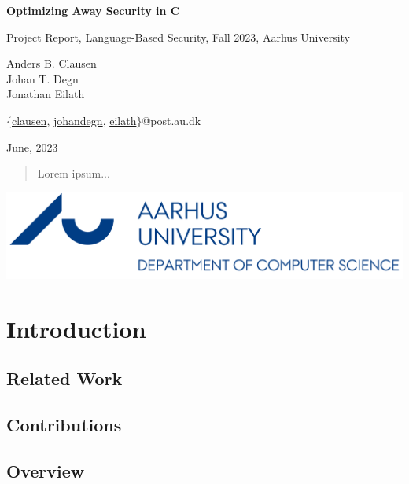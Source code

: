 \documentclass{article}
\begin{document}
\begin{titlepage}
  \vspace*{\fill}
  \begin{center}
    \huge
    \textbf{Optimizing Away Security in C}
        
    \vspace{0.2cm}
    \small
    Project Report, Language-Based Security, Fall 2023, Aarhus University
        
    \vspace{0.4cm}
    \large
    Anders B. Clausen\\ Johan T. Degn\\ Jonathan Eilath

    \vspace{0.2cm}
    \small
    $\{$\href{mailto:clausen@post.au.com}{clausen}, \href{mailto:johandegn@post.au.com}{johandegn}, \href{mailto:eilath@post.au.com}{eilath}$\}$@post.au.dk

    \vspace{0.4cm}
    June, 2023
  \end{center}

  \begin{abstract}
    Lorem ipsum...
  \end{abstract}

  \vspace*{\fill}

  \begin{center}
    \includegraphics*[width=0.2\linewidth]{assets/au_logo.png}
  \end{center}
\end{titlepage}



\pagebreak

\tableofcontents

\pagebreak
{} 
\section{Introduction}
\subsection{Related Work}
\subsection{Contributions}
\subsection{Overview}
\end{document}
